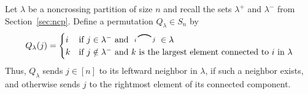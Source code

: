 \documentclass[12pt]{article}
\theoremstyle{definition}
\theoremstyle{remark}
\numberwithin{equation}{section}
\newcommand{\edge}[2]{\tikz[scale = 0.75, baseline = -0.2cm]{
\draw (0.1, 0) node[inner sep = 0ex] (a) {};
\node[left, xshift = 0.1cm, yshift = -0.1cm] at (a) {$\scriptstyle #1$};
\draw (0.9, 0)  node[inner sep = 0ex] (b) {};
\node[right, xshift = -0.1cm, yshift = -0.1cm] at (b) {$\scriptstyle #2$};
\draw[thick] (a) to[out = 35, in = 145] (b);}}
\begin{document}
Let $\lambda$ be a noncrossing partition of size $n$ and recall the sets $\lambda^{+}$ and $\lambda^{-}$ from Section~\ref{sec:ncp}.  
Define a permutation $Q_{\lambda} \in S_{n}$ by 
\[
Q_{\lambda}(j) = \begin{cases} i & \text{if $j \in \lambda^{-}$ and $ \edge{i}{j} \in \lambda$} \\
k & \text{if $j \notin \lambda^{-}$ and $k$ is the largest element connected to $i$ in $\lambda$}
\end{cases}
\]
Thus, $Q_{\lambda}$ sends $j \in [n]$ to its leftward neighbor in $\lambda$, if such a neighbor exists, and otherwise sends $j$ to the rightmost element of its connected component.  
\end{document}
